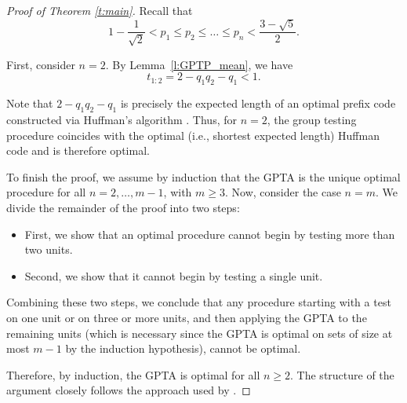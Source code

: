 \documentclass[12pt]{article}
\begin{document}
\begin{proof}[Proof of Theorem \ref{t:main}]
Recall that
\begin{equation} \label{eq:prob_bounds}
1 - \frac{1}{\sqrt{2}} < p_1 \leq p_2 \leq \dots \leq p_n < \frac{3 - \sqrt{5}}{2}.
\end{equation}

First, consider \( n = 2 \). By Lemma~\ref{l:GPTP_mean}, we have
\[
t_{1:2} = 2 - q_1 q_2 - q_1 < 1.
\]

Note that \( 2 - q_1 q_2 - q_1 \) is precisely the expected length of an optimal prefix code constructed via Huffman's algorithm \citep{H1952}. Thus, for \( n = 2 \), the group testing procedure coincides with the optimal (i.e., shortest expected length) Huffman code and is therefore optimal.



To finish the proof, we assume by induction that the {GPTA} is the unique optimal procedure for all \( n = 2, \dots, m-1 \), with \( m \geq 3 \). Now, consider the case \( n = m \). We divide the remainder of the proof into two steps:

\begin{itemize}
    \item First, we show that an optimal procedure cannot begin by testing more than two units.
    \item Second, we show that it cannot begin by testing a single unit.
\end{itemize}

Combining these two steps, we conclude that any procedure starting with a test on one unit or on three or more units, and then applying the {GPTA} to the remaining units (which is necessary since the {GPTA} is optimal on sets of size at most \( m-1 \) by the induction hypothesis), cannot be optimal.

Therefore, by induction, the {GPTA} is optimal for all \( n \geq 2 \). The structure of the argument closely follows the approach used by \cite{YH1990}.



\end{proof}
\end{document}
